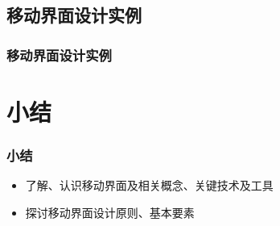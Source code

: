 \documentclass{beamer}
\begin{document}
\subsection{移动界面设计实例}
\begin{frame}
	\frametitle{移动界面设计实例}

\end{frame}

\section{小结}
\begin{frame}
	\frametitle{小结}
	\begin{itemize}
		\item 了解、认识移动界面及相关概念、关键技术及工具
		\item 探讨移动界面设计原则、基本要素
	\end{itemize}
\end{frame}
\end{document}
